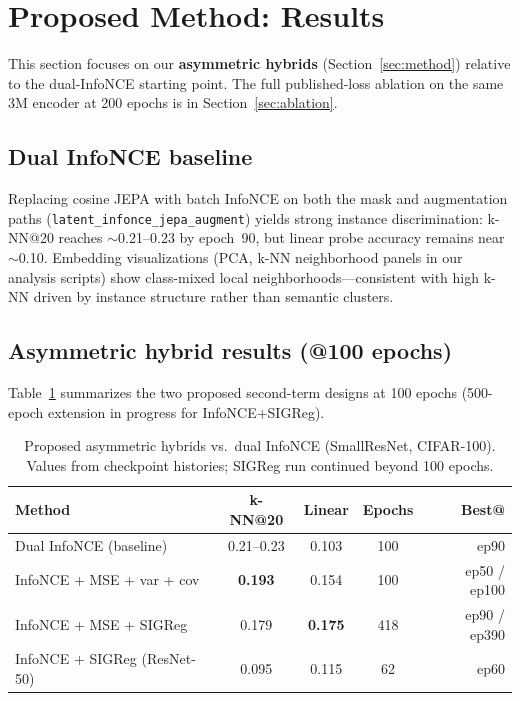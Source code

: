 \section{Proposed Method: Results}
\label{sec:results-proposed}

This section focuses on our \textbf{asymmetric hybrids}
(Section~\ref{sec:method}) relative to the dual-InfoNCE starting point.
The full published-loss ablation on the same 3M encoder at 200 epochs is in
Section~\ref{sec:ablation}.

\subsection{Dual InfoNCE baseline}
\label{sec:results-dual}

Replacing cosine JEPA with batch InfoNCE on both the mask and augmentation
paths (\texttt{latent\_infonce\_jepa\_augment}) yields strong instance
discrimination: k-NN@20 reaches $\sim$0.21--0.23 by epoch~90, but linear
probe accuracy remains near $\sim$0.10.
Embedding visualizations (PCA, k-NN neighborhood panels in our analysis
scripts) show class-mixed local neighborhoods---consistent with high k-NN
driven by instance structure rather than semantic clusters.

\subsection{Asymmetric hybrid results (@100 epochs)}
\label{sec:results-hybrid}

Table~\ref{tab:hybrid} summarizes the two proposed second-term designs at
100 epochs (500-epoch extension in progress for InfoNCE+SIGReg).

\begin{table}[t]
  \centering
  \caption{Proposed asymmetric hybrids vs.\ dual InfoNCE (SmallResNet, CIFAR-100).
  Values from checkpoint histories; SIGReg run continued beyond 100 epochs.}
  \label{tab:hybrid}
  \begin{tabular}{lcccr}
    \toprule
    Method & k-NN@20 & Linear & Epochs & Best@ \\
    \midrule
    Dual InfoNCE (baseline)     & 0.21--0.23 & 0.103 & 100 & ep90 \\
    InfoNCE + MSE + var + cov     & \textbf{0.193} & 0.154 & 100 & ep50 / ep100 \\
    InfoNCE + MSE + SIGReg        & 0.179 & \textbf{0.175} & 418 & ep90 / ep390 \\
    InfoNCE + SIGReg (ResNet-50)  & 0.095 & 0.115 & 62 & ep60 \\
    \bottomrule
  \end{tabular}
\end{table}

